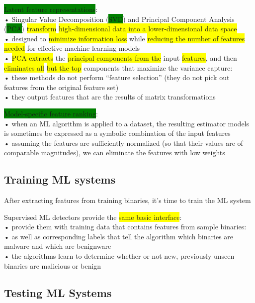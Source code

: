 \documentclass[]{project_plan}
\begin{document}
\colorbox{green}{Latent feature representations}:\\
• Singular Value Decomposition (\colorbox{green}{SVD}) and Principal Component Analysis (\colorbox{green}{PCA}) \colorbox{yellow}{transform} \colorbox{yellow}{high-dimensional data into a lower-dimensional data space}\\
• designed to \colorbox{yellow}{minimize information loss} while \colorbox{yellow}{reducing the number of features needed} for effective machine learning models\\
• \colorbox{yellow}{PCA extracts} the \colorbox{yellow}{principal components from the} input \colorbox{yellow}{features}, and then \colorbox{yellow}{eliminates all} \colorbox{yellow}{but the top} components that maximize the variance capture:\\
• these methods do not perform “feature selection” (they do not pick out features from the original feature set)\\
• they output features that are the results of matrix transformations

\colorbox{green}{Model-specific feature ranking}:\\
• when an ML algorithm is applied to a dataset, the resulting estimator models is sometimes be expressed as a symbolic combination of the input features\\
• assuming the features are sufficiently normalized (so that their values are of comparable magnitudes), we can eliminate the features with low weights

\subsection{Training ML systems}

After extracting features from training binaries, it’s time to train the ML system

Supervised ML detectors provide the \colorbox{yellow}{same basic interface}:\\
• provide them with training data that contains features from sample binaries:\\
• as well as corresponding labels that tell the algorithm which binaries are malware and which are benignware\\
• the algorithms learn to determine whether or not new, previously unseen binaries are malicious or benign

\subsection{Testing ML Systems}
\end{document}
